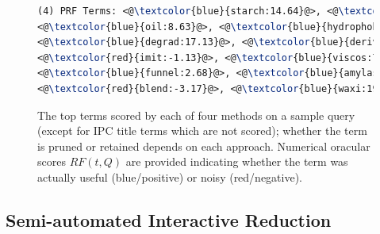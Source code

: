 \begin{figure}[htpb]
\begin{framed}
\begin{lstlisting}[basicstyle=\small\ttfamily , linewidth=\columnwidth,breaklines=true, language=TeX]
(4) PRF Terms: <@\textcolor{blue}{starch:14.64}@>, <@\textcolor{blue}{encapsul:17.50}@>, <@\textcolor{red}{chees:-4.22}@>, 
<@\textcolor{blue}{oil:8.63}@>, <@\textcolor{blue}{hydrophob:5.45}@>, <@\textcolor{blue}{agent:5.19}@>, <@\textcolor{red}{casein:-2.19}@>, 
<@\textcolor{blue}{degrad:17.13}@>, <@\textcolor{blue}{deriv:11.97}@>, <@\textcolor{blue}{tablet:5.30}@>, <@\textcolor{red}{debranch:-10.58}@>, 
<@\textcolor{red}{imit:-1.13}@>, <@\textcolor{blue}{viscos:7.77}@>, <@\textcolor{blue}{oxid:5.97}@>, <@\textcolor{blue}{activ:5.98}@>, <@\textcolor{blue}{osa:9.32}@>, 
<@\textcolor{blue}{funnel:2.68}@>, <@\textcolor{blue}{amylas:26.06}@>, <@\textcolor{red}{amylopectin:-7.14}@>, <@\textcolor{blue}{maiz:20.61}@>, 
<@\textcolor{red}{blend:-3.17}@>, <@\textcolor{blue}{waxi:19.41}@>, <@\textcolor{blue}{convert:31.81}@>, 

 \end{lstlisting} 
 \vspace*{-2ex}
\end{framed}
 \vspace*{-2ex}
  \caption{The top terms scored by each of four methods on a sample
    query (except for IPC title terms which are not scored); whether the term is
    pruned or retained depends on each approach.
    Numerical oracular scores $\mathit{RF}(t,Q)$ are provided
    indicating whether the term was actually useful (blue/positive) or
    noisy (red/negative).}
  \label{fig:anecdotal}  
\end{figure}
\FloatBarrier
\subsection{Semi-automated Interactive Reduction}
\label{sec:SemiAutomatedInteractiveReduction}

